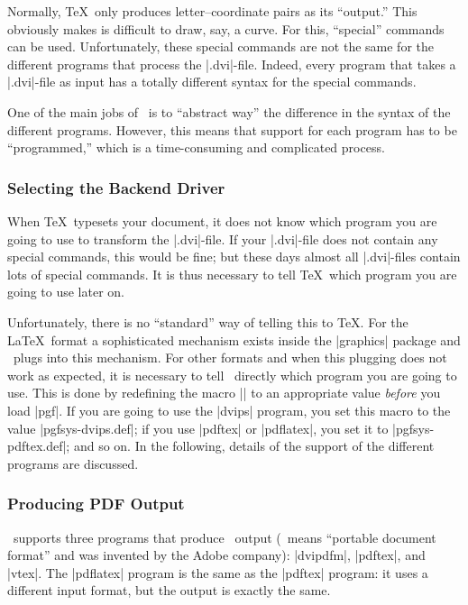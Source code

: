 Normally, \TeX\ only produces letter--coordinate pairs as its
``output.'' This obviously makes is difficult to draw, say, a
curve. For this, ``special'' commands can be used. Unfortunately,
these special commands are not the same for the different programs
that process the |.dvi|-file. Indeed, every program that takes a
|.dvi|-file as input has a totally different syntax for the special
commands.

One of the main jobs of \pgfname\ is to ``abstract way'' the
difference in the syntax of the different programs. However, this
means that support for each program has to be ``programmed,'' which is
a time-consuming and complicated process. 


\subsubsection{Selecting the Backend Driver}

When \TeX\ typesets your document, it does not know which program
you are going to use to transform the |.dvi|-file. If your |.dvi|-file
does not contain any special commands, this would be fine; but these
days almost all |.dvi|-files contain lots of special commands. It is
thus necessary to tell \TeX\ which program you are going to use later
on.

Unfortunately, there is no ``standard'' way of telling this to
\TeX. For the \LaTeX\ format a sophisticated mechanism exists inside
the |graphics| package and \pgfname\ plugs into this mechanism. For
other formats and when this plugging does not work as expected, it is
necessary to tell \pgfname\ directly which program you are going to
use. This is done by redefining the macro |\pgfsysdriver| to an
appropriate value \emph{before} you load |pgf|. If you are going to
use the |dvips| program, you set this macro to the value
|pgfsys-dvips.def|; if you use |pdftex| or |pdflatex|, you set it to
|pgfsys-pdftex.def|; and so on. In the following, details of the
support of the different programs are discussed.


\subsubsection{Producing PDF Output}

\pgfname\ supports three programs that produce \pdf\ output (\pdf\ means
``portable document format'' and was invented by the Adobe company):
|dvipdfm|, |pdftex|, and |vtex|. The |pdflatex| program is the same as the
|pdftex| program: it uses a different input format, but the output is
exactly the same.

